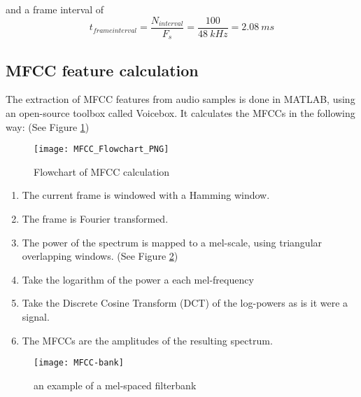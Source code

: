 and a frame interval of
\begin{equation}
t_{frame interval} = \dfrac{N_{interval}}{F_s} = \dfrac{100}{48\ kHz} = 2.08\ ms
\end{equation}
\newpage
\subsection{MFCC feature calculation}
The extraction of MFCC features from audio samples is done in MATLAB, using an open-source toolbox called Voicebox.
It calculates the MFCCs in the following way: (See Figure \ref{fig:mfccFlow})

\begin{figure}[H]
\centering
\texttt{[image: MFCC\_Flowchart\_PNG]}
\caption{Flowchart of MFCC calculation}
\label{fig:mfccFlow}
\end{figure}

\begin{enumerate}

\item
The current frame is windowed with a Hamming window.

\item
The frame is Fourier transformed.

\item
The power of the spectrum is mapped to a mel-scale, using triangular overlapping windows. (See Figure \ref{fig:mfccBank})

\item
Take the logarithm of the power a each mel-frequency

\item
Take the Discrete Cosine Transform (DCT) of the log-powers as is it were a signal.

\item
The MFCCs are the amplitudes of the resulting spectrum.

\end{enumerate}

\begin{figure}[H]
\centering
\texttt{[image: MFCC-bank]}
\caption{an example of a mel-spaced filterbank}
\label{fig:mfccBank}
\end{figure}
